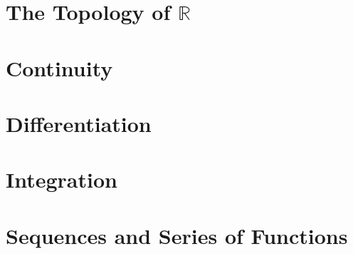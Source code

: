 \documentclass[12pt]{article}
\begin{document}
\newpage
\section{The Topology of $\mathbb{R}$}
\newpage
\section{Continuity}
\newpage
\section{Differentiation}
\newpage
\section{Integration}
\newpage
\section{Sequences and Series of Functions}
\end{document}
